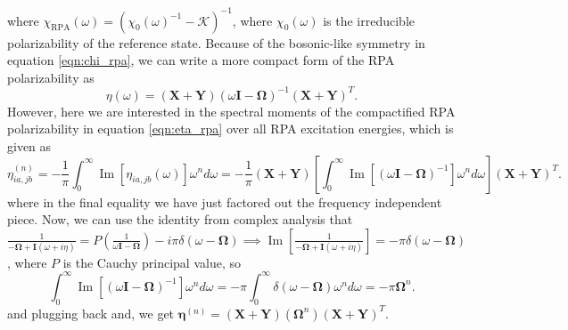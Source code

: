 where $\chi_{\text{RPA}}(\omega)=\left(\chi_0(\omega)^{-1}-\mathcal{K}\right)^{-1}$, where $\chi_0(\omega)$ is the irreducible polarizability of the reference state. Because of the bosonic-like symmetry in equation \ref{eqn:chi_rpa}, we can write a more compact form of the RPA polarizability as
\begin{equation}
    \eta(\omega)=(\mathbf{X}+\mathbf{Y})(\omega \mathbf{I}-\boldsymbol{\Omega})^{-1}(\mathbf{X}+\mathbf{Y})^T.
    \label{eqn:eta_rpa}
\end{equation}
However, here we are interested in the spectral moments of the compactified RPA polarizability in equation \ref{eqn:eta_rpa} over all RPA excitation energies, which is given as
\begin{equation}
    \eta_{i a, j b}^{(n)}=-\frac{1}{\pi} \int_0^{\infty} \operatorname{Im}\left[\eta_{i a, j b}(\omega)\right] \omega^n d \omega = -\frac{1}{\pi} \left(\bm{X}+\bm{Y}\right)\left[\int_0^{\infty}\operatorname{Im}\left[\left(\omega \mathbf{I}-\boldsymbol{\Omega}\right)^{-1}\right] \omega^n d \omega\right]\left(\bm{X}+\bm{Y}\right)^T.
    \label{eqn:eta_rpa_moments}
\end{equation}
where in the final equality we have just factored out the frequency independent piece. Now, we can use the identity from complex analysis that $\frac{1}{ - \bm{\Omega } + \bm{I}\left( \omega + i\eta\right)}= P\left(\frac{1}{\omega\bm{I} - \bm{\Omega}}\right) - i\pi\delta(\omega - \bm{\Omega}) \implies \operatorname{Im}\left[\frac{1}{ - \bm{\Omega} + \bm{I}\left( \omega + i\eta\right)}\right] = -\pi\delta(\omega - \bm{\Omega})$, where $P$ is the Cauchy principal value, so
\begin{equation}
    \int_0^{\infty}\operatorname{Im}\left[\left(\omega \mathbf{I}-\boldsymbol{\Omega}\right)^{-1}\right] \omega^n d \omega = -\pi \int_0^{\infty}\delta(\omega - \bm{\Omega}) \omega^n d \omega = -\pi\bm{\Omega}^n.
    \label{eqn:eta_rpa_moments_identity}
\end{equation}
and plugging back and, we get $\bm{\eta}^{(n)} = \left(\bm{X}+\bm{Y}\right)\left(\bm{\Omega}^n\right)\left(\bm{X}+\bm{Y}\right)^T$.
